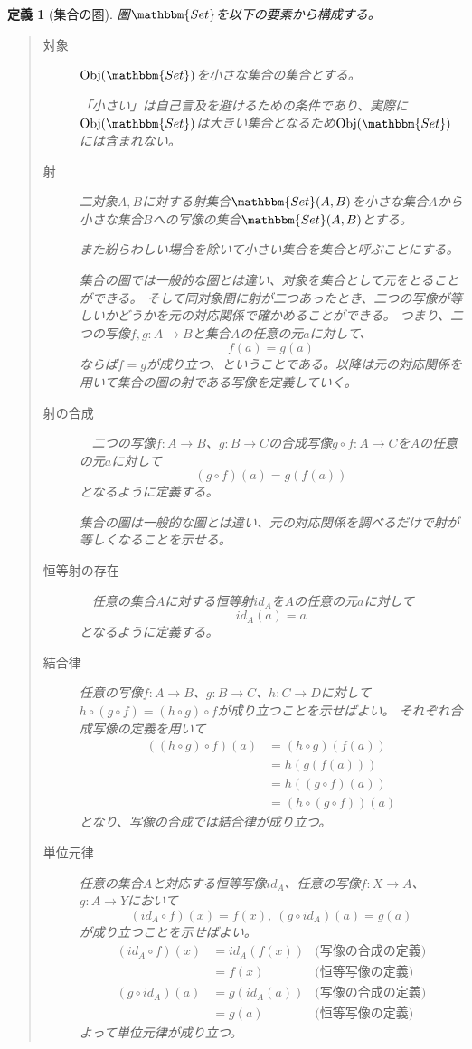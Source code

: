 \documentclass[uplatex,dvipdfmx]{jsarticle}
\newcommand{\cat}[1]{\mathbbm{#1}}
\newcommand{\arrow}{\rightarrow}
\newcommand{\obj}[1]{\mathrm{Obj}(\cat{#1})}
\newcommand{\mor}[3]{#1:#2\arrow #3}
\newcommand{\arset}[3]{\cat{#1}(#2,#3)}
\newtheorem{define}{定義}[section]
\numberwithin{proof}{subsection}
\numberwithin{prop}{subsection}
\numberwithin{define}{subsection}
\begin{document}
	\begin{define}[集合の圏]
		圏$\cat{Set}$を以下の要素から構成する。
		\begin{quote}
			\begin{description}
				\item[対象] $\obj{Set}$を小さな集合の集合とする。

				「小さい」は自己言及を避けるための条件であり、実際に$\obj{Set}$は大きい集合となるため$\obj{Set}$には含まれない。
				\item[射] 二対象$A,B$に対する射集合$\arset{Set}{A}{B}$を小さな集合$A$から小さな集合$B$への写像の集合$\arset{Set}{A}{B}$とする。

				また紛らわしい場合を除いて小さい集合を集合と呼ぶことにする。

				集合の圏では一般的な圏とは違い、対象を集合として元をとることができる。
				そして同対象間に射が二つあったとき、二つの写像が等しいかどうかを元の対応関係で確かめることができる。
				つまり、二つの写像$\mor{f,g}{A}{B}$と集合$A$の任意の元$a$に対して、\[f(a)=g(a)\]ならば$f=g$が成り立つ、ということである。以降は元の対応関係を用いて集合の圏の射である写像を定義していく。

				\item[射の合成] 　二つの写像$\mor{f}{A}{B}$、$\mor{g}{B}{C}$の合成写像$\mor{g\circ f}{A}{C}$を$A$の任意の元$a$に対して\[(g\circ f)(a)=g(f(a))\]となるように定義する。

				集合の圏は一般的な圏とは違い、元の対応関係を調べるだけで射が等しくなることを示せる。
				\item[恒等射の存在]　任意の集合$A$に対する恒等射$id_A$を$A$の任意の元$a$に対して\[id_A(a)=a\]となるように定義する。
				\item[結合律] 任意の写像$\mor{f}{A}{B}$、$\mor{g}{B}{C}$、$\mor{h}{C}{D}$に対して$h\circ(g\circ f)=(h\circ g)\circ f$が成り立つことを示せばよい。
				それぞれ合成写像の定義を用いて
				\begin{align*}
					((h\circ g)\circ f)(a)&=(h\circ g)(f(a))\\
					&=h(g(f(a)))\\
					&=h((g\circ f)(a))\\
					&=(h\circ(g\circ f))(a)
				\end{align*}
				となり、写像の合成では結合律が成り立つ。
				\item[単位元律] 任意の集合$A$と対応する恒等写像$id_A$、任意の写像$\mor{f}{X}{A}$、$\mor{g}{A}{Y}$において\[(id_A\circ f)(x)=f(x),\ (g\circ id_A)(a)=g(a)\]が成り立つことを示せばよい。
				\begin{align*}
					(id_A\circ f)(x)&=id_A(f(x))&\text{(写像の合成の定義)}\\
					&=f(x)&\text{{(恒等写像の定義)}}\\
					(g\circ id_A)(a)&=g(id_A(a))&\text{(写像の合成の定義)}\\
					&=g(a)&\text{{(恒等写像の定義)}}
				\end{align*}
				よって単位元律が成り立つ。
			\end{description}
		\end{quote}
	\end{define}
	
\end{document}
